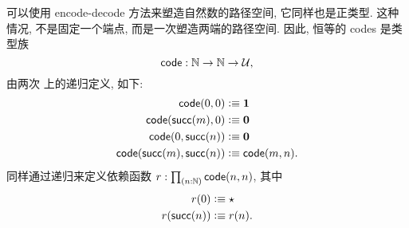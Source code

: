 %
%
可以使用 encode-decode 方法来塑造自然数的路径空间, 它同样也是正类型.
这种情况, 不是固定一个端点, 而是一次塑造两端的路径空间.
因此, 恒等的 codes 是类型族
\[\mathsf{code}:\mathbb{N}\to\mathbb{N}\to\mathcal{U},\]
由两次 \N 上的递归定义, 如下:
\begin{align*}
  \mathsf{code}(0,0) &\vcentcolon\equiv \mathbf{1}\\
  \mathsf{code}(\mathsf{succ}(m),0) &\vcentcolon\equiv \mathbf{0}\\
  \mathsf{code}(0,\mathsf{succ}(n)) &\vcentcolon\equiv \mathbf{0}\\
  \mathsf{code}(\mathsf{succ}(m),\mathsf{succ}(n)) &\vcentcolon\equiv \mathsf{code}(m,n).
\end{align*}
同样通过递归来定义依赖函数 $r:\prd{n:\N} \code(n,n)$, 其中
\begin{align*}
  r(0) &\vcentcolon\equiv \star\\
  r(\mathsf{succ}(n)) &\vcentcolon\equiv r(n).
\end{align*}

